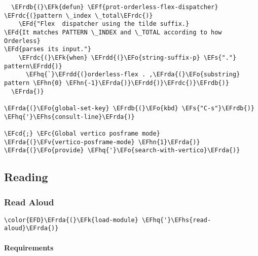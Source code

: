 \documentclass[a4wide,10pt]{article}
\newcommand{\EFc}[1]{\textcolor{EFc}{#1}} %
\newcommand{\EFcd}[1]{\textcolor{EFcd}{#1}} %
\newcommand{\EFs}[1]{\textcolor{EFs}{#1}} %
\newcommand{\EFd}[1]{\textcolor{EFd}{#1}} %
\newcommand{\EFk}[1]{\textcolor{EFk}{#1}} %
\newcommand{\EFf}[1]{\textcolor{EFf}{#1}} %
\newcommand{\EFv}[1]{\textcolor{EFv}{#1}} %
\newcommand{\EFo}[1]{\textcolor{EFo}{#1}} %
\newcommand{\EFhn}[1]{\textcolor{EFhn}{\textbf{#1}}} %
\newcommand{\EFhq}[1]{\textcolor{EFhq}{#1}} %
\newcommand{\EFhs}[1]{\textcolor{EFhs}{#1}} %
\newcommand{\EFrda}[1]{\textcolor{EFrda}{#1}} %
\newcommand{\EFrdb}[1]{\textcolor{EFrdb}{#1}} %
\newcommand{\EFrdc}[1]{\textcolor{EFrdc}{#1}} %
\newcommand{\EFrdd}[1]{\textcolor{EFrdd}{#1}} %
\begin{document}
\begin{Code}
\begin{Verbatim}
  \EFrdb{(}\EFk{defun} \EFf{prot-orderless-flex-dispatcher} \EFrdc{(}pattern \_index \_total\EFrdc{)}
    \EFd{"Flex  dispatcher using the tilde suffix.}
\EFd{It matches PATTERN \_INDEX and \_TOTAL according to how Orderless}
\EFd{parses its input."}
    \EFrdc{(}\EFk{when} \EFrdd{(}\EFo{string-suffix-p} \EFs{"."} pattern\EFrdd{)}
      \EFhq{`}\EFrdd{(}orderless-flex . ,\EFrda{(}\EFo{substring} pattern \EFhn{0} \EFhn{-1}\EFrda{)}\EFrdd{)}\EFrdc{)}\EFrdb{)}
  \EFrda{)}

\EFrda{(}\EFo{global-set-key} \EFrdb{(}\EFo{kbd} \EFs{"C-s"}\EFrdb{)} \EFhq{'}\EFhs{consult-line}\EFrda{)}

\EFcd{;} \EFc{Global vertico posframe mode}
\EFrda{(}\EFv{vertico-posframe-mode} \EFhn{1}\EFrda{)}
\EFrda{(}\EFo{provide} \EFhq{'}\EFo{search-with-vertico}\EFrda{)}
\end{Verbatim}
\end{Code}
\subsection{Reading}
\label{sec:org204592b}
\subsubsection{Read Aloud}
\label{sec:orgc41708c}
\begin{Code}
\begin{Verbatim}
\color{EFD}\EFrda{(}\EFk{load-module} \EFhq{'}\EFhs{read-aloud}\EFrda{)}
\end{Verbatim}
\end{Code}
\paragraph{Requirements}
\label{sec:orgd3369a0}
\end{document}
